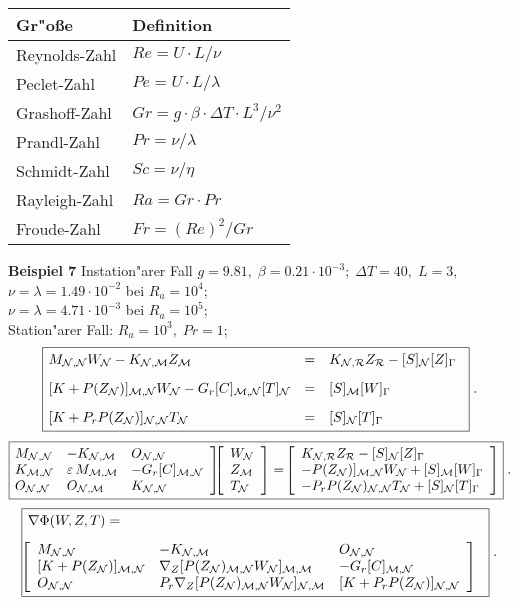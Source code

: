 \documentclass[12pt,a4paper,leqno]{article}
\begin{document}
%
\bc
\begin{tabular}{|ll|}\hline
Gr"o\ss e     & Definition \\ \hline
Reynolds-Zahl & $Re = U\cdot L/\nu $\\
Peclet-Zahl   & $Pe = U \cdot L/\lambda $ \\
Grashoff-Zahl  & $Gr = g \cdot \beta \cdot \Delta T \cdot L^3/\nu ^2$\\
Prandl-Zahl   & $Pr = \nu /\lambda $ \\
Schmidt-Zahl  & $Sc = \nu /\eta $\\
Rayleigh-Zahl & $Ra = Gr\cdot Pr$\\
Froude-Zahl   & $Fr = (Re)^2/Gr$\\
\hline
\end{tabular}
\ec
{\bf Beispiel 7} Instation"arer Fall
$g = 9.81, \; \beta = 0.21\cdot 10^{-3}; \; \Delta T = 40, \; L = 3$,\\
$\nu = \lambda = 1.49 \cdot 10^{-2}$ bei $R_a = 10^4$;\\
$\nu = \lambda = 4.71\cdot 10^{-3}$ bei $R_a = 10^5$;\\
Station"arer Fall: $R_a = 10^3, \; Pr = 1$;
\newpage
\begin{equation}\label{e1107.7}
\fbox{$
\ba{.}{lll}
M_{\N,\N}W_{\N} - K_{\N,\M}Z_{\M}
&=& \dis K_{\N,\R}Z_{\R} - [S]_{\N}[Z]_{\Gamma}\\[2ex]
%
[K + P(Z_{\N})]_{\M,\N}W_{\N} - G_r[C]_{\M,\N}[T]_{\N}
&=& \dis [S]_{\M}[W]_{\Gamma}\\[2ex]
%
[K + P_r P(Z_{\N})]_{\N,\N}T_{\N}
&=& \dis [S]_{\N}[T]_{\Gamma}
\ea{.}
$}\;.
\end{equation}
\begin{equation}\label{e1107.8}
\fbox{$
\ba{.}{lll}
M_{\N,\N} & - K_{\N,\M} & O_{\N,\N}\\
%
K_{\M,\N}         & \epsilon\,M_{\M,\M}   & - G_r[C]_{\M,\N}\\
O_{\N,\N} & O_{\N,\M}   & K_{\N,\N}
\ea{]}
\ba{[}{l}
 W_{\N}\\Z_{\M}\\T_{\N}
\ea{]}
= \ \ba{[}{l}
K_{\N,\R}Z_{\R} - [S]_{\N}[Z]_{\Gamma}\\
- P(Z_{\N})]_{\M,\N}W_{\N} + [S]_{\M}[W]_{\Gamma}\\
-P_r P(Z_{\N})_{\N,\N}T_{\N} + [S]_{\N}[T]_{\Gamma}
\ea{]}
$}\;.
\end{equation}
\begin{equation}\label{e1107.9}
\fbox{$
\ba{.}{l}
\nabla \Phi(W,Z,T) = \\[2ex]
\ba{[}{lll}
M_{\N,\N} & - K_{\N,\M} & O_{\N,\N}\\[0ex]
%
[K + P(Z_{\N})]_{\M,\N}         &
\nabla_Z[P(Z_{\N})_{\M,\N}W_{\N}]_{\M,\M}  &
 - G_r[C]_{\M,\N}\\
O_{\N,\N}  & P_r\nabla_Z[P(Z_{\N})_{\M,\N}W_{\N}]_{\N,\M}& [K + P_rP(Z_{\N})]_{\N,\N}
\ea{]}
\ea{.}
$}\;.
\end{equation}
\end{document}
